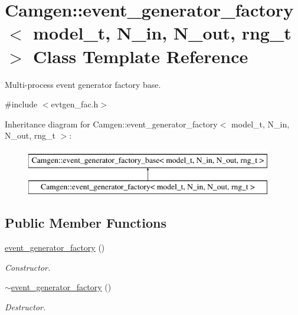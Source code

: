 \hypertarget{a00213}{}\section{Camgen\+:\+:event\+\_\+generator\+\_\+factory$<$ model\+\_\+t, N\+\_\+in, N\+\_\+out, rng\+\_\+t $>$ Class Template Reference}
\label{a00213}


Multi-\/process event generator factory base.  




{\ttfamily \#include $<$evtgen\+\_\+fac.\+h$>$}

Inheritance diagram for Camgen\+:\+:event\+\_\+generator\+\_\+factory$<$ model\+\_\+t, N\+\_\+in, N\+\_\+out, rng\+\_\+t $>$\+:\begin{figure}[H]
\begin{center}
\leavevmode
\includegraphics[height=2.000000cm]{a00213}
\end{center}
\end{figure}
\subsection*{Public Member Functions}
\begin{DoxyCompactItemize}
\item 
\hypertarget{a00213_a8f21f4745b6cb3eca816062857030937}{}\hyperlink{a00213_a8f21f4745b6cb3eca816062857030937}{event\+\_\+generator\+\_\+factory} ()\label{a00213_a8f21f4745b6cb3eca816062857030937}

\begin{DoxyCompactList}\small\item\em Constructor. \end{DoxyCompactList}\item 
\hypertarget{a00213_a00612f00a78a8b26d177ec698c78c87b}{}\hyperlink{a00213_a00612f00a78a8b26d177ec698c78c87b}{$\sim$event\+\_\+generator\+\_\+factory} ()\label{a00213_a00612f00a78a8b26d177ec698c78c87b}

\begin{DoxyCompactList}\small\item\em Destructor. \end{DoxyCompactList}\end{DoxyCompactItemize}
